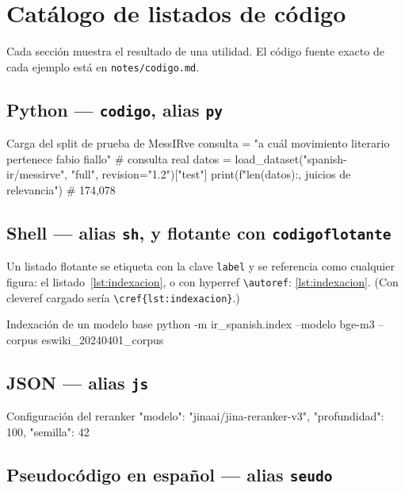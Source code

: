 \documentclass[11pt,letterpaper]{book}
\begin{document}
\chapter{Catálogo de listados de código}

Cada sección muestra el resultado de una utilidad. El código fuente exacto
de cada ejemplo está en \texttt{notes/codigo.md}.

\section{Python --- \texttt{codigo}, alias \texttt{py}}

\begin{codigo}[py]{Carga del split de prueba de MessIRve}
consulta = "a cuál movimiento literario pertenece fabio fiallo"  # consulta real
datos = load_dataset("spanish-ir/messirve", "full", revision="1.2")["test"]
print(f"{len(datos):,} juicios de relevancia")  # 174,078
\end{codigo}

\section{Shell --- alias \texttt{sh}, y flotante con \texttt{codigoflotante}}

Un listado flotante se etiqueta con la clave \texttt{label} y se referencia como
cualquier figura: el listado~\ref{lst:indexacion}, o con hyperref
\verb|\autoref|: \autoref{lst:indexacion}. (Con cleveref cargado sería
\verb|\cref{lst:indexacion}|.)

\begin{codigoflotante}[sh, label={lst:indexacion}]{Indexación de un modelo base}
python -m ir_spanish.index --modelo bge-m3 --corpus eswiki_20240401_corpus
\end{codigoflotante}

\section{JSON --- alias \texttt{js}}

\begin{codigo}[js]{Configuración del reranker}
{"modelo": "jinaai/jina-reranker-v3", "profundidad": 100, "semilla": 42}
\end{codigo}

\section{Pseudocódigo en español --- alias \texttt{seudo}}
\end{document}
